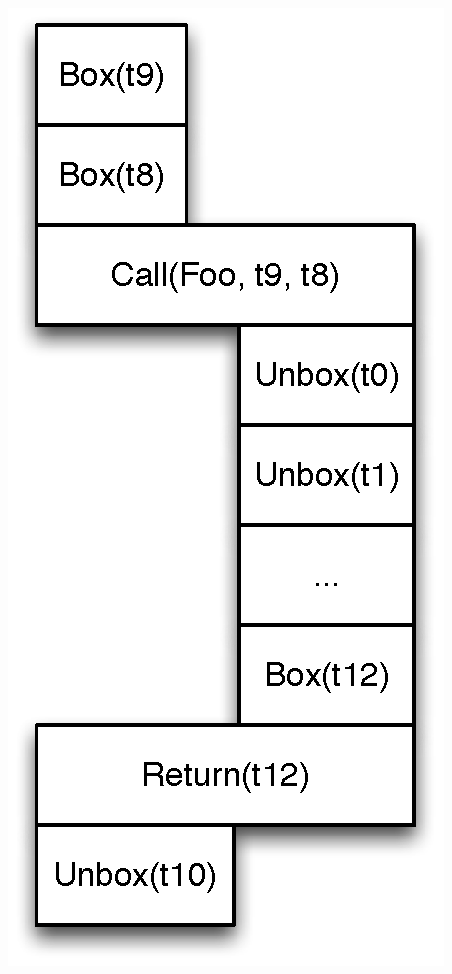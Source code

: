 \documentclass[preprint]{sigplanconf}
\begin{document}
\ifx\pdfoutput\undefined
\includegraphics{figures/boxunboxbox.eps}
\else
\end{document}
